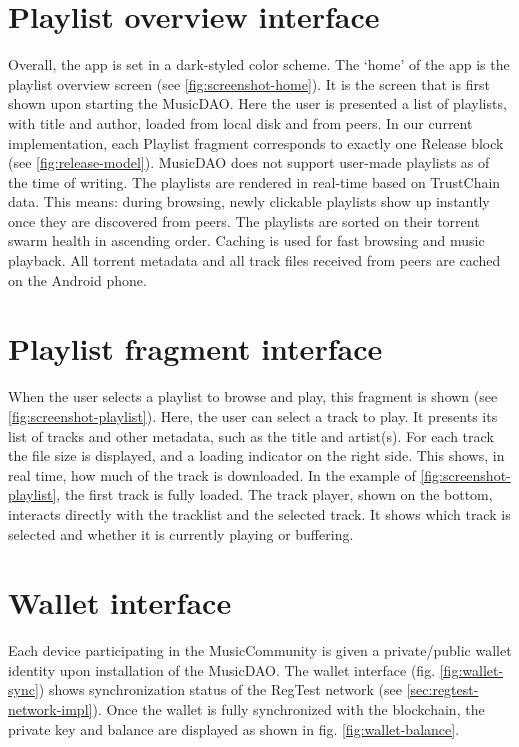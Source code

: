 \section{Playlist overview interface}
Overall, the app is set in a dark-styled color scheme. The `home' of the app is the playlist overview screen (see \ref{fig:screenshot-home}). It is the screen that is first shown upon starting the MusicDAO. Here the user is presented a list of playlists, with title and author, loaded from local disk and from peers. In our current implementation, each Playlist fragment corresponds to exactly one Release block (see \ref{fig:release-model}). MusicDAO does not support user-made playlists as of the time of writing. The playlists are rendered in real-time based on TrustChain data. This means: during browsing, newly clickable playlists show up instantly once they are discovered from peers. The playlists are sorted on their torrent swarm health in ascending order. Caching is used for fast browsing and music playback. All torrent metadata and all track files received from peers are cached on the Android phone. 
\section{Playlist fragment interface}
When the user selects a playlist to browse and play, this fragment is shown (see \ref{fig:screenshot-playlist}). Here, the user can select a track to play. It presents its list of tracks and other metadata, such as the title and artist(s). For each track the file size is displayed, and a loading indicator on the right side. This shows, in real time, how much of the track is downloaded. In the example of \ref{fig:screenshot-playlist}, the first track is fully loaded. The track player, shown on the bottom, interacts directly with the tracklist and the selected track. It shows which track is selected and whether it is currently playing or buffering.
\section{Wallet interface}
Each device participating in the MusicCommunity is given a private/public wallet identity upon installation of the MusicDAO. The wallet interface (fig. \ref{fig:wallet-sync}) shows synchronization status of the RegTest network (see \ref{sec:regtest-network-impl}). Once the wallet is fully synchronized with the blockchain, the private key and balance are displayed as shown in fig. \ref{fig:wallet-balance}. 

